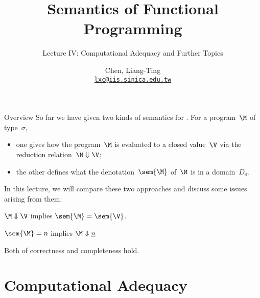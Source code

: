 \title{Semantics of Functional Programming}
\subtitle{Lecture IV: Computational Adequacy and Further Topics}
\author[L.-T. Chen]{Chen, Liang-Ting\\
  \href{mailto:lxc@iis.sinica.edu.tw}{\texttt{lxc@iis.sinica.edu.tw}}}

\frame{\maketitle}

\begin{frame}{Overview}
  So far we have given two kinds of semantics for \PCF{}. For a program~$\M$ of
  type~$\sigma$,
  \begin{itemize}
    \item one gives how the program~$\M$ is evaluated to a closed value~$\V$
      via the reduction relation~$\M \Downarrow\V$;
    \item the other defines what the denotation~$\sem{\M}$ of~$\M$ is in a
      domain~$D_\sigma$. 
    \end{itemize}
  In this lecture, we will compare these two approaches and discuss some issues
  arising from them:
  \begin{description}
    \item[Correctness] $\M \Downarrow \V$ implies $\sem{\M} = \sem{\V}$.
    \item[Completeness] $\sem{\M} = n$ implies $\M \Downarrow \underline{n}$
    \item[Computational adequacy]
      Both of correctness and completeness hold. 
  \end{description}

\end{frame}

\section{Computational Adequacy}  

